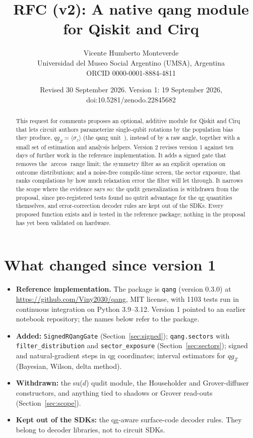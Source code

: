 \documentclass[11pt]{article}
\title{RFC (v2): A native qang module for Qiskit and Cirq}
\author{Vicente Humberto Monteverde\\
\small Universidad del Museo Social Argentino (UMSA), Argentina\\
\small ORCID 0000-0001-8884-4811}
\date{\small Revised 30 September 2026. Version 1: 19 September 2026, doi:10.5281/zenodo.22845682}
\newcommand{\qgZ}{qg_Z}
\begin{document}
\sloppy
\maketitle

\begin{abstract}
This request for comments proposes an optional, additive module for Qiskit and Cirq that lets circuit
authors parameterize single-qubit rotations by the population bias they produce, $\qgZ=\langle\sigma_z\rangle$
(the qang unit~\cite{monteverde2026qang}), instead of by a raw angle, together with a small set of
estimation and analysis helpers. Version 2 revises version 1 against ten days of further work in the
reference implementation. It adds a signed gate that removes the $\arccos$ range limit; the symmetry filter
as an explicit operation on outcome distributions; and a noise-free compile-time screen, the sector
exposure, that ranks compilations by how much relaxation error the filter will let through. It
narrows the scope where the evidence says so: the qudit generalization is withdrawn from the proposal,
since pre-registered tests found no qutrit advantage for the qg quantities themselves, and
error-correction decoder rules are kept out of the SDKs. Every proposed function exists and is tested
in the reference package; nothing in the proposal has yet been validated on hardware.
\end{abstract}

\section{What changed since version 1}

\begin{itemize}
\item \textbf{Reference implementation.} The package is \texttt{qang} (version 0.3.0) at
\url{https://github.com/Viny2030/qang}, MIT license, with 1103 tests run in continuous integration on
Python 3.9--3.12. Version 1 pointed to an earlier notebook repository; the names below refer to the
package.
\item \textbf{Added:} \texttt{SignedRQangGate} (Section~\ref{sec:signed}); \texttt{qang.sectors} with
\texttt{filter\_distribution} and \texttt{sector\_exposure} (Section~\ref{sec:sectors}); signed and
natural-gradient steps in qg coordinates; interval estimators for $\qgZ$ (Bayesian, Wilson, delta method).
\item \textbf{Withdrawn:} the su($d$) qudit module, the Householder and Grover-diffuser constructors, and
anything tied to shadows or Grover read-outs (Section~\ref{sec:scope}).
\item \textbf{Kept out of the SDKs:} the qg-aware surface-code decoder rules. They belong to decoder
libraries, not to circuit SDKs.
\end{itemize}
\end{document}
